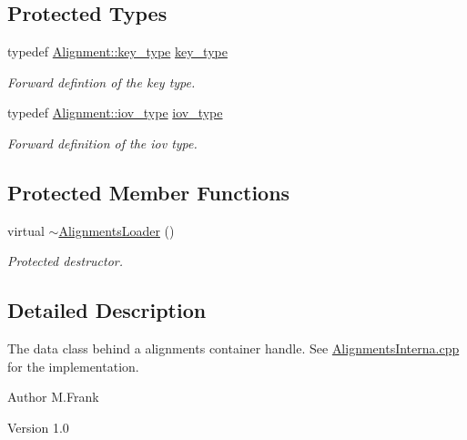 \subsection*{Protected Types}
\begin{DoxyCompactItemize}
\item 
typedef \hyperlink{class_d_d4hep_1_1_alignments_1_1_alignment_ab824a65f935a0c79b9ea1a7a85014b88}{Alignment::key\_\-type} \hyperlink{class_d_d4hep_1_1_alignments_1_1_alignments_loader_af56e6294e72dacbe001c1f24b8381d5d}{key\_\-type}
\begin{DoxyCompactList}\small\item\em Forward defintion of the key type. \item\end{DoxyCompactList}\item 
typedef \hyperlink{class_d_d4hep_1_1_i_o_v}{Alignment::iov\_\-type} \hyperlink{class_d_d4hep_1_1_alignments_1_1_alignments_loader_a632271e6cb9198528a0826d9082561d1}{iov\_\-type}
\begin{DoxyCompactList}\small\item\em Forward definition of the iov type. \item\end{DoxyCompactList}\end{DoxyCompactItemize}
\subsection*{Protected Member Functions}
\begin{DoxyCompactItemize}
\item 
virtual \hyperlink{class_d_d4hep_1_1_alignments_1_1_alignments_loader_af2ad650d826e5656254929ae956ee2ef}{$\sim$AlignmentsLoader} ()
\begin{DoxyCompactList}\small\item\em Protected destructor. \item\end{DoxyCompactList}\end{DoxyCompactItemize}


\subsection{Detailed Description}
The data class behind a alignments container handle. See \hyperlink{_alignments_interna_8cpp}{AlignmentsInterna.cpp} for the implementation.

\begin{DoxyAuthor}{Author}
M.Frank 
\end{DoxyAuthor}
\begin{DoxyVersion}{Version}
1.0 
\end{DoxyVersion}


